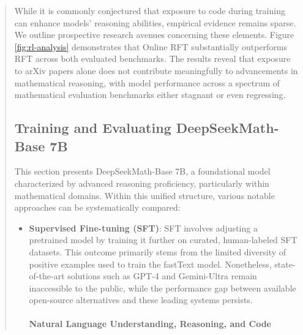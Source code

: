 \begin{abstract}
\begin{itemize}[topsep=0pt]
While it is commonly conjectured that exposure to code during training can enhance models' reasoning abilities, empirical evidence remains sparse. We outline prospective research avenues concerning these elements. Figure \ref{fig:rl-analysis} demonstrates that Online RFT substantially outperforms RFT across both evaluated benchmarks. The results reveal that exposure to arXiv papers alone does not contribute meaningfully to advancements in mathematical reasoning, with model performance across a spectrum of mathematical evaluation benchmarks either stagnant or even regressing. \end{itemize}

\subsection{Training and Evaluating DeepSeekMath-Base 7B}

This section presents DeepSeekMath-Base 7B, a foundational model characterized by advanced reasoning proficiency, particularly within mathematical domains. Within this unified structure, various notable approaches can be systematically compared:

\begin{itemize}
    \item \textbf{Supervised Fine-tuning (SFT)}: SFT involves adjusting a pretrained model by training it further on curated, human-labeled SFT datasets. This outcome primarily stems from the limited diversity of positive examples used to train the fastText model. Nonetheless, state-of-the-art solutions such as GPT-4 \citep{gpt4} and Gemini-Ultra \citep{gemini} remain inaccessible to the public, while the performance gap between available open-source alternatives and these leading systems persists. \paragraph{Natural Language Understanding, Reasoning, and Code}


\end{itemize}
\end{abstract}
